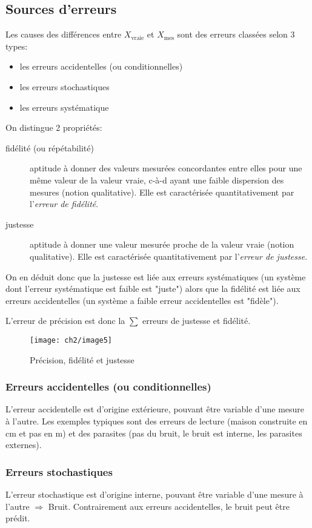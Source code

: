 \subsection{Sources d'erreurs}
Les causes des différences entre $X_{\text{vraie}}$ et $X_{\text{mes}}$ sont des erreurs classées selon 3 types:
\begin{itemize}
	\item les erreurs accidentelles (ou conditionnelles)
	\item les erreurs stochastiques
	\item les erreurs systématique
\end{itemize}
On distingue 2 propriétés:
\begin{description}
	\item[fidélité (ou répétabilité)] aptitude à donner des valeurs mesurées concordantes entre elles pour une même valeur de la valeur vraie, c-à-d ayant une faible dispersion des mesures (notion qualitative). Elle est caractérisée quantitativement par l'\emph{erreur de fidélité}. 
	\item[justesse] aptitude à donner une valeur mesurée proche de la valeur vraie (notion qualitative). Elle est caractérisée quantitativement par l'\emph{erreur de justesse}.
\end{description}
On en déduit donc que la justesse est liée aux erreurs systématiques (un système dont l'erreur systématique est faible est "juste") alors que la fidélité est liée aux erreurs accidentelles (un système a faible erreur accidentelles est "fidèle").

L'erreur de précision est donc la $\sum$ erreurs de justesse et fidélité.
\begin{figure}[H]
	\centering 
	\texttt{[image: ch2/image5]}
	\caption{Précision, fidélité et justesse}
\end{figure}
\subsubsection{Erreurs accidentelles (ou conditionnelles)}
L'erreur accidentelle est d'origine extérieure, pouvant être variable d'une mesure à l'autre. Les exemples typiques sont des erreurs de lecture (maison construite en cm et pas en m) et des parasites (\danger pas du bruit, le bruit est interne, les parasites externes).
\subsubsection{Erreurs stochastiques}
L'erreur stochastique est d'origine interne, pouvant être variable d'une mesure à l'autre $\Rightarrow$ Bruit. Contrairement aux erreurs accidentelles, le bruit peut être prédit.
